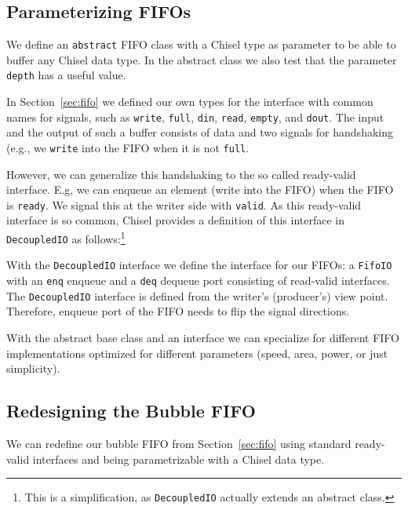 \documentclass[%
    10pt,
    headinclude, footexclude,
    openright, %
    notitlepage,
    cleardoubleempty,
    headsepline,
    pointlessnumbers,
    bibtotoc, idxtotoc,
    ]{scrbook}
\newcommand{\code}[1]{{\small{\texttt{#1}}}}
\newcommand{\codefoot}[1]{{\footnotesize{\texttt{#1}}}}
\begin{document}
\subsection{Parameterizing FIFOs}

We define an \code{abstract}
FIFO class with a Chisel type as parameter to be able to buffer
any Chisel data type. In the abstract class we also test that the
parameter \code{depth} has a useful value.


In Section~\ref{sec:fifo} we defined our own types for the interface with common
names for signals, such as \code{write}, \code{full}, \code{din}, \code{read},
\code{empty}, and \code{dout}. The input and the output of such a buffer consists
of data and two signals for handshaking (e.g., we \code{write} into the FIFO when
it is not \code{full}.

However, we can generalize this handshaking to the so called ready-valid interface.
E.g, we can enqueue an element (write into the FIFO) when the FIFO is \code{ready}.
We signal this at the writer side with \code{valid}.
As this ready-valid interface is so common, Chisel provides a definition
of this interface in \code{DecoupledIO} as follows:\footnote{This is a simplification,
as \codefoot{DecoupledIO} actually extends an abstract class.}


\noindent With the \code{DecoupledIO} interface we define the interface for our FIFOs:
a \code{FifoIO} with an \code{enq} enqueue and a \code{deq} dequeue port consisting
of read-valid interfaces.
 The \code{DecoupledIO} interface is defined from the writer's (producer's) view point.
Therefore, enqueue port of the FIFO needs to flip the signal directions.



With the abstract base class and an interface we can specialize for different
FIFO implementations optimized for different parameters (speed, area, power,
or just simplicity).

\subsection{Redesigning the Bubble FIFO}

We can redefine our bubble FIFO from Section~\ref{sec:fifo} using standard
ready-valid interfaces and being parametrizable with a Chisel data type.
\end{document}
